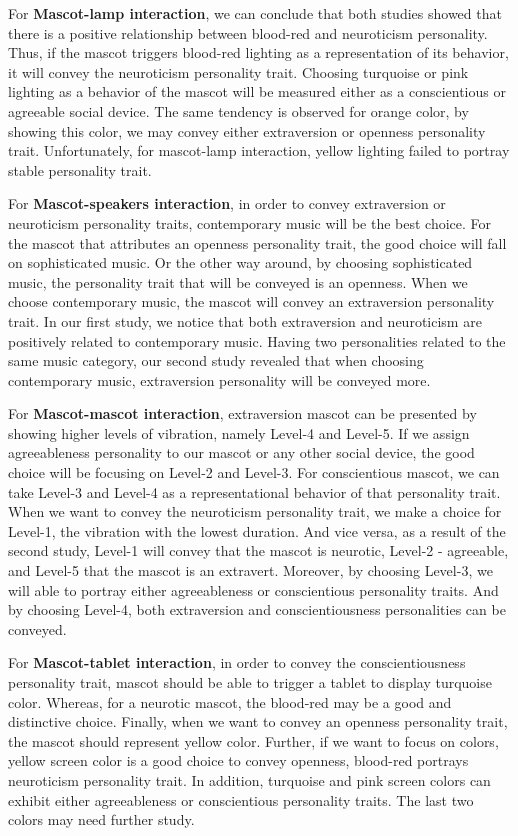 \par For \textbf{Mascot-lamp interaction}, we can conclude that both studies showed that
there is a positive relationship between blood-red and neuroticism personality.
Thus, if the mascot triggers blood-red lighting as a representation of its behavior,
it will convey the neuroticism personality trait.
Choosing turquoise or pink lighting as a behavior of the
mascot will be measured either as a conscientious or agreeable social device.
The same tendency is observed for orange color, by showing this color, we may convey
either extraversion or openness personality trait.
Unfortunately, for mascot-lamp interaction, yellow lighting failed to portray stable personality trait.

\par For \textbf{Mascot-speakers interaction}, in order to convey extraversion or neuroticism personality traits,
contemporary music will be the best choice.
For the mascot that attributes an openness personality trait,
the good choice will fall on sophisticated music.
Or the other way around, by choosing sophisticated music, the personality trait that
will be conveyed is an openness.
When we choose contemporary music, the mascot will convey an extraversion personality trait.
In our first study, we notice that both extraversion and neuroticism are positively related to contemporary music.
Having two personalities related to the same music category, our second study
revealed that when choosing contemporary music, extraversion personality will be conveyed more.

\par For \textbf{Mascot-mascot interaction}, extraversion mascot can be presented by
showing higher levels of vibration, namely Level-4 and Level-5.
If we assign agreeableness personality to our mascot or any other social device,
the good choice will be focusing on Level-2 and Level-3.
For conscientious mascot, we can take Level-3 and Level-4 as a representational behavior of that personality trait.
When we want to convey the neuroticism personality trait, we make a choice for Level-1,
the vibration with the lowest duration.
And vice versa, as a result of the second study, Level-1 will convey that the mascot
is neurotic, Level-2 - agreeable, and Level-5 that the mascot is an extravert.
Moreover, by choosing Level-3, we will able to portray either agreeableness or conscientious personality traits.
And by choosing Level-4, both extraversion and conscientiousness personalities can be conveyed.

\par For \textbf{Mascot-tablet interaction}, in order to convey the conscientiousness personality trait,
mascot should be able to trigger a tablet to display turquoise color.
Whereas, for a neurotic mascot, the blood-red may be a good and distinctive choice.
Finally, when we want to convey an openness personality trait, the mascot should represent yellow color.
Further, if we want to focus on colors, yellow screen color is a good choice to convey openness,
blood-red portrays neuroticism personality trait.
In addition, turquoise and pink screen colors can exhibit either agreeableness or
conscientious personality traits.
The last two colors may need further study.


